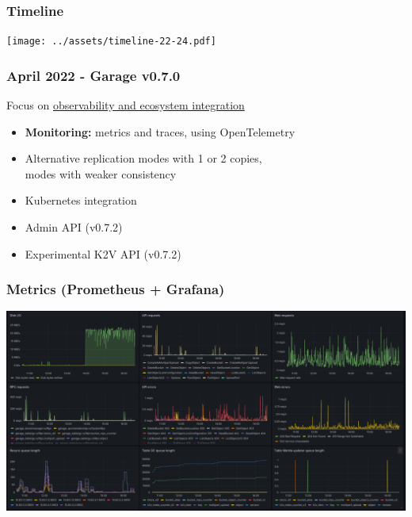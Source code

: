 \documentclass[aspectratio=169]{beamer}
\begin{document}
\begin{frame}
	\frametitle{Timeline}
	\begin{center}
		\texttt{[image: ../assets/timeline-22-24.pdf]}
	\end{center}
\end{frame}


\begin{frame}
	\frametitle{April 2022 - Garage v0.7.0}
	Focus on \underline{observability and ecosystem integration}
	\vspace{2em}
	\begin{itemize}
		\item \textbf{Monitoring:} metrics and traces, using OpenTelemetry
			\vspace{1em}
		\item Alternative replication modes with 1 or 2 copies,\\
			modes with weaker consistency
			\vspace{1em}
		\item Kubernetes integration
			\vspace{1em}
		\item Admin API (v0.7.2)
			\vspace{1em}
		\item Experimental K2V API (v0.7.2)
	\end{itemize}
\end{frame}

\begin{frame}
	\frametitle{Metrics (Prometheus + Grafana)}
	\begin{center}
		\includegraphics[width=.9\linewidth]{../assets/grafana_dashboard.png}
	\end{center}
\end{frame}
\end{document}
